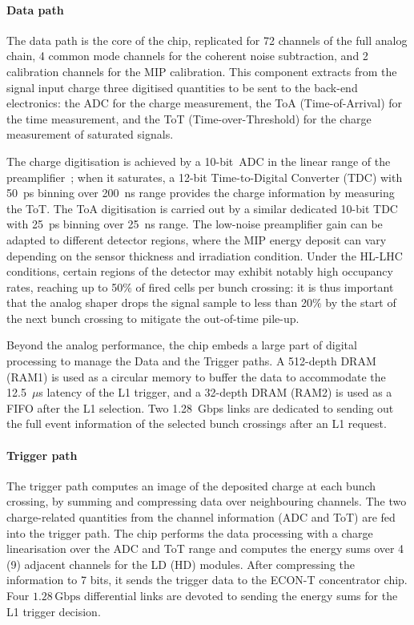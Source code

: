 \paragraph{Data path}
The data path is the core of the chip, replicated for 72 channels of the full analog chain, 4 common mode channels for the coherent noise subtraction, and 2 calibration channels for the MIP calibration. This component extracts from the signal input charge three digitised quantities to be sent to the back-end electronics: the ADC for the charge measurement, the ToA (Time-of-Arrival) for the time measurement, and the ToT (Time-over-Threshold) for the charge measurement of saturated signals. 

The charge digitisation is achieved by a 10-bit~ADC in the linear range of the preamplifier~\cite{Firlej_2015}; when it saturates, a 12-bit Time-to-Digital Converter (TDC) with 50~ps binning over 200~ns range provides the charge information by measuring the ToT. The ToA digitisation is carried out by a similar dedicated 10-bit TDC with 25~ps binning over 25~ns range.
The low-noise preamplifier gain can be adapted to different detector regions, where the MIP energy deposit can vary depending on the sensor thickness and irradiation condition.
Under the HL-LHC conditions, certain regions of the detector may exhibit notably high occupancy rates, reaching up to 50$\%$ of fired cells per bunch crossing: it is thus important that the analog shaper drops the signal sample to less than 20$\%$ by the start of the next bunch crossing to mitigate the out-of-time pile-up.

Beyond the analog performance, the chip embeds a large part of digital processing to manage the Data and the Trigger paths. A 512-depth DRAM (RAM1) is used as a circular memory to buffer the data to accommodate the 12.5~$\mu$s latency of the L1 trigger, and a 32-depth DRAM (RAM2) is used as a FIFO after the L1 selection.
Two 1.28~Gbps links are dedicated to sending out the full event information of the selected bunch crossings after an L1 request.

\paragraph{Trigger path}
The trigger path computes an image of the deposited charge at each bunch crossing, by summing and compressing data over neighbouring channels. The two charge-related quantities from the channel information (ADC and ToT) are fed into the trigger path. The chip performs the data processing with a charge linearisation over the ADC and ToT range and computes the energy sums over 4 (9) adjacent channels for the LD (HD) modules. After compressing the information to 7 bits, it sends the trigger data to the ECON-T concentrator chip.
Four $1.28\,\textrm{Gbps}$ differential links are devoted to sending the energy sums for the L1 trigger decision.

